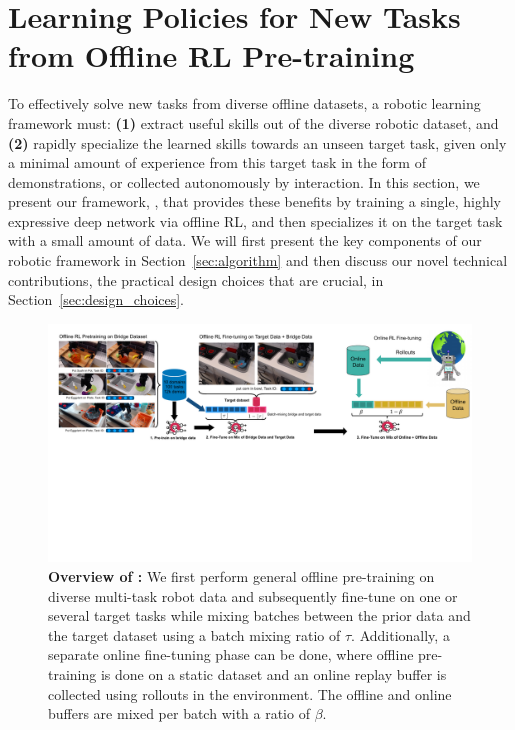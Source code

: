 \vspace{-0.1cm}
\section{Learning Policies for New Tasks from Offline RL Pre-training}
\label{sec:method}
\vspace{-0.2cm}

To effectively solve new tasks from diverse offline datasets, a robotic learning framework must: \textbf{(1)} extract useful skills out of the diverse robotic dataset, and \textbf{(2)} rapidly specialize the learned skills towards an unseen target task, given only a minimal amount of experience from this target task in the form of demonstrations, or collected autonomously by interaction. In this section, we present our framework, \ptrmethodname, that provides these benefits by training a single, highly expressive deep network via offline RL, and then specializes it on the target task with a small amount of data. We will first present the key components of our robotic framework in Section~\ref{sec:algorithm} and then discuss our novel technical contributions, the practical design choices that are crucial, in Section~\ref{sec:design_choices}.    

\begin{figure}
  \centering
  \includegraphics[width=1.0\linewidth]{chapters/ptr/system_overview.pdf}
  \vspace{-0.2cm}
  \caption{ \label{fig:system_overview} \footnotesize \textbf{Overview of \ptrmethodname:} We first perform general offline pre-training on diverse multi-task robot data and subsequently fine-tune on one or several target tasks while mixing batches between the prior data and the target dataset using a batch mixing ratio of $\tau$. Additionally, a separate online fine-tuning phase can be done, where offline pre-training is done on a static dataset and an online replay buffer is collected using rollouts in the environment. The offline and online buffers are mixed per batch with a ratio of $\beta$.}
  \vspace{-0.25cm}
\end{figure}

